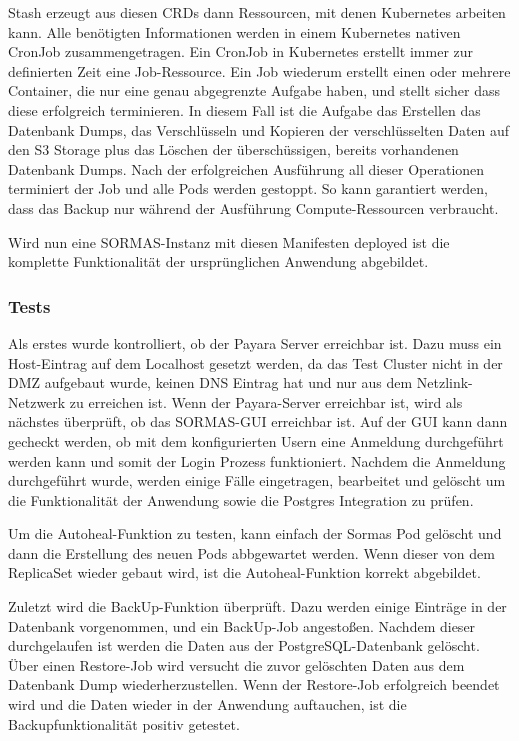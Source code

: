 Stash erzeugt aus diesen \ac{CRD}s dann Ressourcen, mit denen Kubernetes arbeiten kann.
Alle benötigten Informationen werden in einem Kubernetes nativen CronJob zusammengetragen.
Ein CronJob in Kubernetes erstellt immer zur definierten Zeit eine Job-Ressource. 
Ein Job wiederum erstellt einen oder mehrere Container, die nur eine genau abgegrenzte Aufgabe haben, und stellt sicher dass diese erfolgreich terminieren. 
In diesem Fall ist die Aufgabe das Erstellen das Datenbank Dumps, das Verschlüsseln und Kopieren der verschlüsselten Daten auf den \ac{S3} Storage plus das Löschen der überschüssigen, bereits vorhandenen Datenbank Dumps.
Nach der erfolgreichen Ausführung all dieser Operationen terminiert der Job und alle Pods werden gestoppt. 
So kann garantiert werden, dass das Backup nur während der Ausführung Compute-Ressourcen verbraucht. 

Wird nun eine \ac{SORMAS}-Instanz mit diesen Manifesten deployed ist die komplette Funktionalität der ursprünglichen Anwendung abgebildet.

\subsubsection{Tests}
\label{ref:tests}
Als erstes wurde kontrolliert, ob der Payara Server erreichbar ist.
Dazu muss ein Host-Eintrag auf dem Localhost gesetzt werden, da das Test Cluster nicht in der \ac{DMZ} aufgebaut wurde, keinen \ac{DNS} Eintrag hat und nur aus dem Netzlink-Netzwerk zu erreichen ist. 
Wenn der Payara-Server erreichbar ist, wird als nächstes überprüft, ob das \ac{SORMAS}-\ac{GUI} erreichbar ist.
Auf der \ac{GUI} kann dann gecheckt werden, ob mit dem konfigurierten Usern eine Anmeldung durchgeführt werden kann und somit der Login Prozess funktioniert.
Nachdem die Anmeldung durchgeführt wurde, werden einige Fälle eingetragen, bearbeitet und gelöscht um die Funktionalität der Anwendung sowie die Postgres Integration zu prüfen.

Um die Autoheal-Funktion zu testen, kann einfach der Sormas Pod gelöscht und dann die Erstellung des neuen Pods abbgewartet werden.
Wenn dieser von dem ReplicaSet wieder gebaut wird, ist die Autoheal-Funktion korrekt abgebildet.

Zuletzt wird die BackUp-Funktion überprüft.
Dazu werden einige Einträge in der Datenbank vorgenommen, und ein BackUp-Job angestoßen. 
Nachdem dieser durchgelaufen ist werden die Daten aus der PostgreSQL-Datenbank gelöscht.
Über einen Restore-Job wird versucht die zuvor gelöschten Daten aus dem Datenbank Dump wiederherzustellen. 
Wenn der Restore-Job erfolgreich beendet wird und die Daten wieder in der Anwendung auftauchen, ist die Backupfunktionalität positiv getestet.


